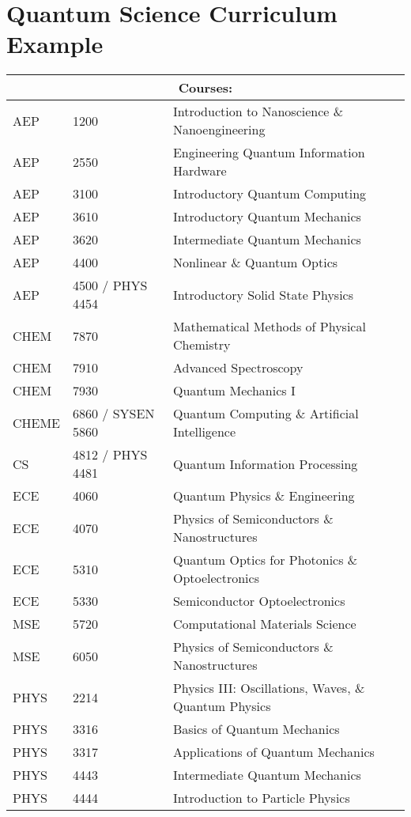 \chapter{\LARGE{Quantum Science Curriculum Example}}

\centering

{
\normalsize\begin{tabular}{ |p{1.5cm}||p{3cm}|p{9cm}| }
 \hline
 \multicolumn{3}{|c|}{Courses:} \\
 \hline
AEP & 1200 & Introduction to Nanoscience \& Nanoengineering\\
AEP & 2550 & Engineering Quantum Information Hardware\\
AEP & 3100 & Introductory Quantum Computing\\
AEP & 3610 & Introductory Quantum Mechanics\\
AEP & 3620 & Intermediate Quantum Mechanics\\
AEP & 4400 & Nonlinear \& Quantum Optics\\
AEP & 4500 / PHYS 4454 & Introductory Solid State Physics\\
CHEM & 7870 & Mathematical Methods of Physical Chemistry\\
CHEM & 7910 & Advanced Spectroscopy\\
CHEM & 7930 & Quantum Mechanics I\\
CHEME & 6860 / SYSEN 5860 & Quantum Computing \& Artificial Intelligence\\
CS & 4812 / PHYS 4481 & Quantum Information Processing\\
ECE & 4060 & Quantum Physics \& Engineering\\
ECE & 4070 & Physics of Semiconductors \& Nanostructures\\
ECE & 5310 & Quantum Optics for Photonics \& Optoelectronics\\
ECE & 5330 & Semiconductor Optoelectronics\\
MSE & 5720 & Computational Materials Science\\
MSE & 6050 & Physics of Semiconductors \& Nanostructures\\
PHYS & 2214 & Physics III: Oscillations, Waves, \& Quantum Physics\\
PHYS & 3316 & Basics of Quantum Mechanics\\
PHYS & 3317 & Applications of Quantum Mechanics\\
PHYS & 4443 & Intermediate Quantum Mechanics\\
PHYS & 4444 & Introduction to Particle Physics\\

\end{tabular}}
